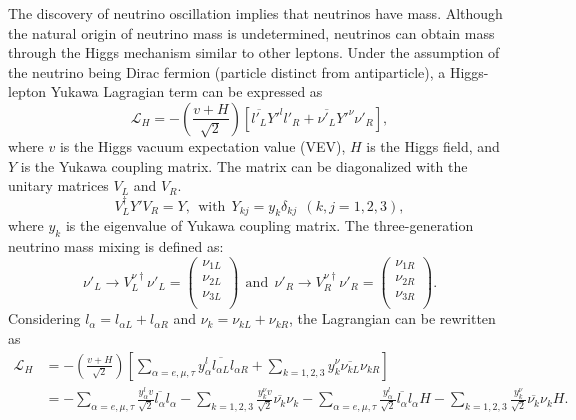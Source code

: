     The discovery of neutrino oscillation implies that neutrinos have mass.
    Although the natural origin of neutrino mass is undetermined, neutrinos can obtain mass through the Higgs mechanism similar to other leptons. 
    Under the assumption of the neutrino being Dirac fermion (particle distinct from antiparticle), a Higgs-lepton Yukawa Lagragian term can be expressed as
\begin{equation}\label{eq4}
\mathscr{L}_H = -\left(\frac{v+H}{\sqrt{2}}\right)\left[\overline{l'_L}Y'^{l}l'_R +\overline{\nu'_L}Y'^{\nu}\nu'_R\right],
\end{equation}
    where $v$ is the Higgs vacuum expectation value (VEV), $H$ is the Higgs field, and $Y$ is the Yukawa coupling matrix. 
    The matrix can be diagonalized with the unitary matrices $V_L$ and $V_R$.
\begin{equation}\label{eq5}
V^\dagger_LY'V_R = Y,\   \ \textrm{with} \   \ Y_{kj} = y_k\delta_{kj} \   \ (k,j = 1,2,3),
\end{equation}
    where $y_k$ is the eigenvalue of Yukawa coupling matrix. The three-generation neutrino mass mixing is defined as:
\begin{equation}\label{eq6}
\nu'_L \rightarrow V^{\nu\dagger}_L\nu'_L = \left( \begin{array}{c}
\nu_{1L} \\
\nu_{2L} \\
\nu_{3L} \\
\end{array} \right) \   \ \text{and} \   \ \nu'_R \rightarrow V^{\nu\dagger}_R\nu'_R = \left( \begin{array}{c}
\nu_{1R} \\
\nu_{2R} \\
\nu_{3R} \\
\end{array} \right).
\end{equation}
    Considering $l_\alpha = l_{\alpha L} + l_{\alpha R}$ and $\nu_k = \nu_{kL} + \nu_{kR}$, the Lagrangian can be rewritten as
\begin{equation}\label{eq7}
\begin{aligned}
\mathscr{L}_H & = -\left(\frac{v+H}{\sqrt{2}}\right)\left[ \sum\limits_{\alpha = e, \mu, \tau} y_{\alpha}^l\overline{l_{\alpha L}}l_{\alpha R} + \sum\limits_{k = 1, 2, 3}y_k^\nu \overline{\nu_{kL}}\nu_{kR} \right] \\
& = - \sum\limits_{\alpha = e, \mu, \tau} \frac{y_\alpha^l v}{\sqrt{2}}\overline{l_{\alpha}}l_{\alpha} - \sum\limits_{k = 1, 2, 3} \frac{y_k^\nu v}{\sqrt{2}} \overline{\nu_{k}}\nu_{k} - \sum\limits_{\alpha = e, \mu, \tau} \frac{y_\alpha^l}{\sqrt{2}}\overline{l_{\alpha}}l_{\alpha}H - \sum\limits_{k = 1, 2, 3} \frac{y_k^\nu}{\sqrt{2}} \overline{\nu_{k}}\nu_{k}H.
\end{aligned}
\end{equation}
